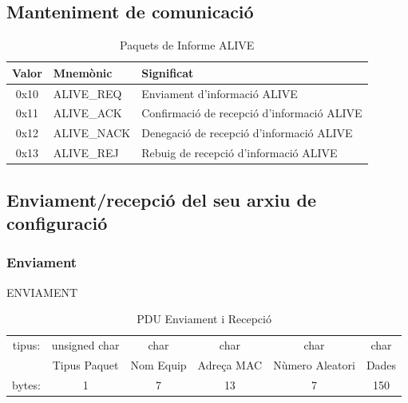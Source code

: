 \documentclass[11pt]{article}
\begin{document}
	\subsection{Manteniment de comunicació}
	
	\begin{table}[h]
\centering
\def\arraystretch{1.5}
\begin{tabular}{ c l l }
\hline
Valor & Mnemònic & Significat\\
\hline
\hline
0x10 & ALIVE\_REQ & Enviament d'informació ALIVE\\
0x11 & ALIVE\_ACK & Confirmació de recepció d'informació ALIVE \\
0x12 & ALIVE\_NACK & Denegació de recepció d'informació ALIVE\\
0x13 & ALIVE\_REJ & Rebuig de recepció d'informació ALIVE\\
\hline
	\end{tabular}
	\caption{Paquets de Informe ALIVE}
	\label{tab:PaquetsInformeALIVE}
\end{table}
\newpage
\subsection{Enviament/recepció del seu arxiu de configuració}
\subsubsection*{Enviament}
ENVIAMENT
\begin{table}[h]

\def\arraystretch{1.5}
\begin{tabular}{ c c c c c c}
tipus: & unsigned char & char &  char & char & char\\
\cline{2-6}
& \multicolumn{1}{|c|}{Tipus Paquet} & \multicolumn{1}{|c|}{Nom Equip} & \multicolumn{1}{|c|}{Adreça MAC} & \multicolumn{1}{|c|}{Nùmero Aleatori} & \multicolumn{1}{|c|}{Dades}\\
\cline{2-6}
bytes: & 1 & 7 & 13 & 7 & 150
	\end{tabular}
	\caption{PDU Enviament i Recepció}
	\label{tab:PDUEnvRec}
\end{table}
\end{document}
